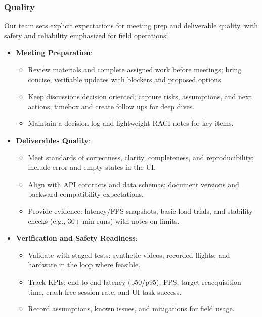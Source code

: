 \documentclass{article}
\begin{document}
\subsubsection*{\color{blue}Quality}

Our team sets explicit expectations for meeting prep and deliverable quality,
with safety and reliability emphasized for field operations:

\begin{itemize}
  \item \textbf{Meeting Preparation}:
        \begin{itemize}
          \item Review materials and complete assigned work before meetings; bring concise,
                verifiable updates with blockers and proposed options.
          \item Keep discussions decision oriented; capture risks, assumptions, and next
                actions; timebox and create follow ups for deep dives.
          \item Maintain a decision log and lightweight RACI notes for key items.
        \end{itemize}

  \item \textbf{Deliverables Quality}:
        \begin{itemize}
          \item Meet standards of correctness, clarity, completeness, and reproducibility;
                include error and empty states in the UI.
          \item Align with API contracts and data schemas; document versions and backward
                compatibility expectations.
          \item Provide evidence: latency/FPS snapshots, basic load trials, and stability
                checks (e.g., 30+ min runs) with notes on limits.
        \end{itemize}

  \item \textbf{Verification and Safety Readiness}:
        \begin{itemize}
          \item Validate with staged tests: synthetic videos, recorded flights, and hardware in
                the loop where feasible.
          \item Track KPIs: end to end latency (p50/p95), FPS, target reacquisition time, crash
                free session rate, and UI task success.
          \item Record assumptions, known issues, and mitigations for field usage.
        \end{itemize}


\end{itemize}
\end{document}

